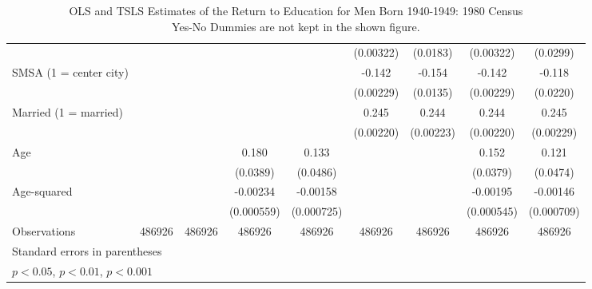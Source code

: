 \documentclass{article}
\begin{document}
\begin{landscape}
\begin{table}[htbp]
\begin{tabular}{l*{8}{c}}
                         &                     &                     &                     &                     &   (0.00322)         &    (0.0183)         &   (0.00322)         &    (0.0299)         \\
[1em]
SMSA (1 = center city)   &                     &                     &                     &                     &      -0.142\sym{***}&      -0.154\sym{***}&      -0.142\sym{***}&      -0.118\sym{***}\\
                         &                     &                     &                     &                     &   (0.00229)         &    (0.0135)         &   (0.00229)         &    (0.0220)         \\
[1em]
Married (1 = married)    &                     &                     &                     &                     &       0.245\sym{***}&       0.244\sym{***}&       0.244\sym{***}&       0.245\sym{***}\\
                         &                     &                     &                     &                     &   (0.00220)         &   (0.00223)         &   (0.00220)         &   (0.00229)         \\
[1em]
Age                      &                     &                     &       0.180\sym{***}&       0.133\sym{**} &                     &                     &       0.152\sym{***}&       0.121\sym{*}  \\
                         &                     &                     &    (0.0389)         &    (0.0486)         &                     &                     &    (0.0379)         &    (0.0474)         \\
[1em]
Age-squared              &                     &                     &    -0.00234\sym{***}&    -0.00158\sym{*}  &                     &                     &    -0.00195\sym{***}&    -0.00146\sym{*}  \\
                         &                     &                     &  (0.000559)         &  (0.000725)         &                     &                     &  (0.000545)         &  (0.000709)         \\
\hline
Observations             &      486926         &      486926         &      486926         &      486926         &      486926         &      486926         &      486926         &      486926         \\
\hline\hline
\multicolumn{9}{l}{\footnotesize Standard errors in parentheses}\\
\multicolumn{9}{l}{\footnotesize \sym{*} \(p<0.05\), \sym{**} \(p<0.01\), \sym{***} \(p<0.001\)}\\
\end{tabular}
\caption[caption]{OLS and TSLS Estimates of the Return to Education for Men Born 1940-1949: 1980 Census \\\hspace{\textwidth}  Yes-No Dummies are not kept in the shown figure.}
\end{table}
\end{landscape}
\end{document}
